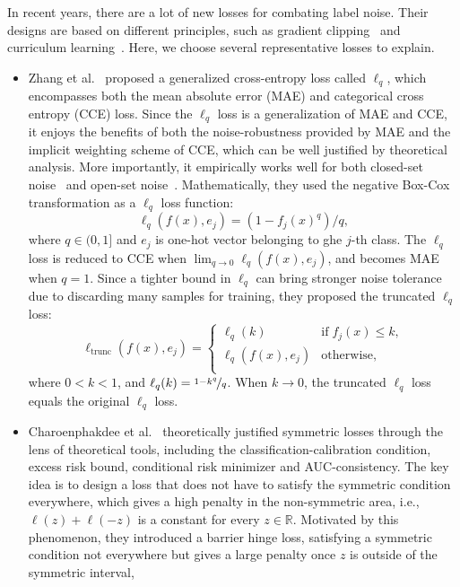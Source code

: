 In recent years, there are a lot of 
new losses for combating label noise. Their designs are based on different principles, such as gradient clipping~ and curriculum learning~. 
Here, we choose several representative losses to explain.
\begin{itemize}[leftmargin=*]
\item Zhang et al.~ proposed a generalized cross-entropy loss called $\ell_q$, which encompasses both the mean absolute error
(MAE) and categorical cross entropy (CCE) loss. Since the $\ell_q$ loss is a generalization of MAE and CCE, it enjoys the benefits of both the noise-robustness provided by MAE and the implicit weighting scheme of CCE, which can be well justified by theoretical analysis.
More importantly, it empirically works well for both closed-set noise~ and open-set noise~.
Mathematically, they used the negative Box-Cox transformation as a 
$\ell_q$ loss function: 
\begin{equation*}
\ell_q(f(x),e_j) = (1-f_j(x)^q) / q,
\end{equation*}
where $q \in (0,1]$ and $e_j$ is one-hot vector belonging to ghe $j$-th class. The $\ell_q$ loss is reduced to CCE when
$\lim_{q\rightarrow0}\ell_q(f(x),e_j)$, and becomes MAE when $q = 1$. Since a
tighter bound in $\ell_q$ can bring stronger noise tolerance due to discarding many samples for training, they proposed the truncated $\ell_q$ loss:
\begin{equation}
\ell_\text{trunc}(f(x),e_j)
=
\begin{cases}
\ell_q(k) & \text{if} \; f_j(x) \leq k, \\
\ell_q(f(x),e_j) & \text{otherwise}, \\
\end{cases}
\end{equation}
where $0 < k < 1$, and $\ell_q(k) = \nicefrac{1-k^q}{q}$. When $k \rightarrow 0$, the truncated $\ell_q$ loss equals the original $\ell_q$ loss.
\item
Charoenphakdee et al.~ theoretically justified symmetric losses through the lens of theoretical tools, including the classification-calibration condition, excess risk bound, conditional risk minimizer and AUC-consistency. The key idea is to design a loss that does not have to satisfy the symmetric condition everywhere, which gives a high penalty in the non-symmetric area,
i.e., $\ell(z) + \ell(-z)$ is a constant for every $z \in \mathbb{R}$. Motivated by this phenomenon, they introduced a barrier hinge loss, satisfying a symmetric condition not everywhere but gives a large penalty once $z$ is outside of the symmetric interval,

\end{itemize}
